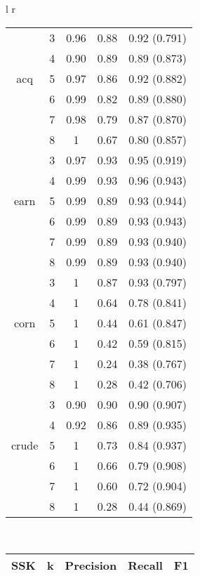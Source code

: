 \begin{tabular}{l r}
\begin{tabular}{| c | c | c | c | c | }
	& 3 & 0.96 & 0.88 & 0.92 (0.791)    \\ 
	& 4 & 0.90 & 0.89 &  0.89 (0.873)   \\
	acq	& 5 & 0.97 & 0.86 & 0.92  (0.882)   \\ 
	& 6 & 0.99 & 0.82 & 0.89  (0.880)   \\
	& 7 & 0.98 & 0.79 & 0.87  (0.870)   \\
	& 8 & 1 & 0.67 & 0.80  (0.857)   \\
	\hline
	
	
	
	& 3 & 0.97 & 0.93 &  0.95 (0.919)   \\ 
	& 4 & 0.99 & 0.93 &  0.96 (0.943)   \\ 
	earn & 5 & 0.99 & 0.89 &  0.93  (0.944)  \\ 
	& 6 & 0.99 & 0.89 &  0.93  (0.943)  \\ 
	& 7 & 0.99 & 0.89 &  0.93  (0.940)  \\ 
	& 8 & 0.99 & 0.89 &  0.93  (0.940)  \\ \hline
	
	
	
	& 3 & 1 & 0.87 & 0.93  (0.797)   \\ 
	& 4 & 1 & 0.64 & 0.78  (0.841)   \\ 
	corn	& 5 & 1 & 0.44 &  0.61 (0.847)   \\ 
	& 6 & 1 & 0.42 & 0.59  (0.815)   \\ 
	& 7 & 1 & 0.24 & 0.38  (0.767)  \\ 
	& 8 & 1 & 0.28& 0.42  (0.706)   \\ \hline
	
	
	& 3 & 0.90 & 0.90 &  0.90  (0.907)  \\ 
	& 4 & 0.92 & 0.86 & 0.89  (0.935)   \\ 
	crude & 5 & 1 & 0.73 &  0.84 (0.937)   \\ 
	& 6 & 1 & 0.66 &  0.79 (0.908)   \\
	& 7 & 1 & 0.60 &  0.72 (0.904)   \\
	& 8 & 1 & 0.28 &  0.44  (0.869)  \\ \hline
	
	
	
\end{tabular} \vspace{10pt} \\ 
\begin{tabular}{| c | c | c | c | c | }
	\hline SSK & k& Precision & Recall & F1   \\ \hline	
	

\end{tabular}
\end{tabular}
